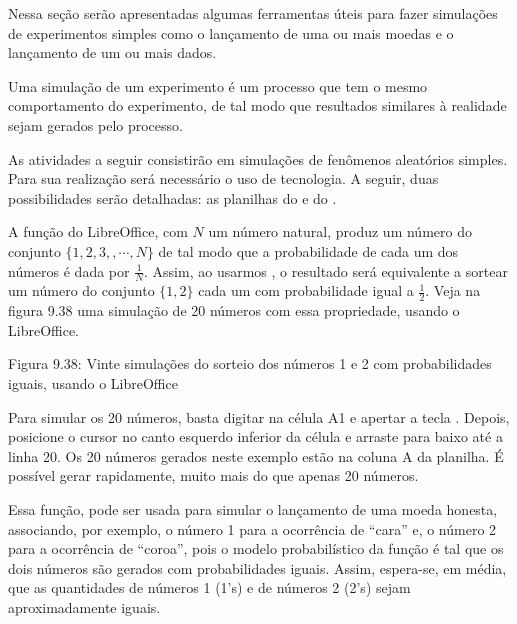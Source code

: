 Nessa seção serão apresentadas algumas ferramentas úteis para fazer simulações de experimentos simples como o lançamento de uma ou mais moedas e  o lançamento de um ou mais dados.

Uma simulação de um experimento é um processo que tem o mesmo comportamento do experimento, de tal modo que resultados similares à realidade sejam gerados pelo processo.

As atividades a seguir consistirão em simulações de fenômenos aleatórios simples. Para sua realização será necessário o uso de tecnologia. A seguir, duas possibilidades serão detalhadas: as planilhas do   e do .

A função  do LibreOffice, com \(N\) um número natural, produz um número do conjunto \(\{1,2,3,,\cdots, N\}\) de tal modo que a probabilidade de cada um dos números é dada por \(\frac{1}{N}\). Assim, ao usarmos , o resultado será equivalente a sortear um número do conjunto \(\{1,2\}\) cada um com probabilidade igual a \(\frac{1}{2}\). Veja na figura 9.38 uma simulação de 20 números com essa propriedade, usando o LibreOffice.
\label{\detokenize{PE511-A:fig-coloque-aqui-o-nome}}
\begin{figure}[H]
\centering

\noindent{}
\label{\detokenize{PE511-A:fig-coloque-aqui-o-nome}}\end{figure}

Figura 9.38: Vinte simulações do sorteio dos números 1 e 2 com probabilidades iguais, usando o LibreOffice

Para simular os 20 números, basta digitar na célula A1  e apertar a tecla . Depois, posicione o cursor no canto esquerdo inferior da célula e arraste para baixo até a linha 20. Os 20 números gerados neste exemplo estão na coluna A da planilha. É possível gerar rapidamente, muito mais do que apenas 20 números.

Essa função,  pode ser usada para simular o lançamento de uma moeda honesta, associando, por exemplo, o número 1 para a ocorrência de “cara” e, o número 2 para a ocorrência de  “coroa”, pois o modelo probabilístico da função  é tal que os dois números são gerados com probabilidades iguais. Assim, espera-se, em média, que as quantidades de números 1 (1’s) e de números 2 (2’s) sejam aproximadamente iguais.

